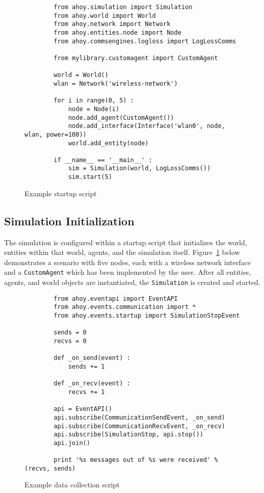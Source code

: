 \documentclass[titlepage]{article}
\begin{document}
\begin{figure}
    \begin{verbatim}
        from ahoy.simulation import Simulation
        from ahoy.world import World
        from ahoy.network import Network
        from ahoy.entities.node import Node
        from ahoy.commsengines.logloss import LogLossComms

        from mylibrary.customagent import CustomAgent

        world = World()
        wlan = Network('wireless-network')

        for i in range(0, 5) :
            node = Node(i)
            node.add_agent(CustomAgent())
            node.add_interface(Interface('wlan0', node, wlan, power=100))
            world.add_entity(node)

        if __name__ == '__main__' :
            sim = Simulation(world, LogLossComms())
            sim.start(5)
    \end{verbatim}
    \caption{Example startup script}
    \label{fig:exstartup}
\end{figure}

\subsection{Simulation Initialization}
The simulation is configured within a startup script that initializes the world, entities within that world, agents, and the simulation itself.  Figure~\ref{fig:exstartup} below demonstrates a scenario with five nodes, each with a wireless network interface and a \texttt{CustomAgent} which has been implemented by the user.  After all entities, agents, and world objects are instantiated, the \texttt{Simulation} is created and started.

\begin{figure}
    \begin{verbatim}
        from ahoy.eventapi import EventAPI
        from ahoy.events.communication import *
        from ahoy.events.startup import SimulationStopEvent

        sends = 0
        recvs = 0

        def _on_send(event) :
            sends += 1

        def _on_recv(event) :
            recvs += 1

        api = EventAPI()
        api.subscribe(CommunicationSendEvent, _on_send)
        api.subscribe(CommunicationRecvEvent, _on_recv)
        api.subscribe(SimulationStop, api.stop())
        api.join()

        print '%s messages out of %s were received' % (recvs, sends)
    \end{verbatim}
    \caption{Example data collection script}
    \label{fig:exdatacollect}
\end{figure}
\end{document}
